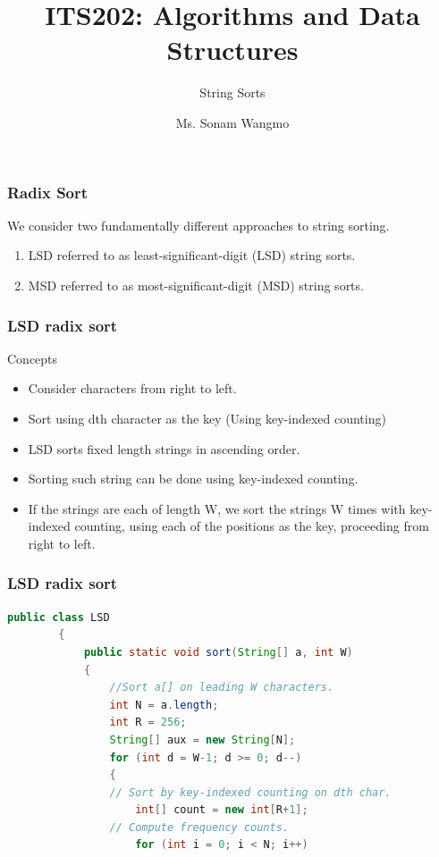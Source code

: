 \documentclass[11pt]{beamer}
\begin{document}
	\author{Ms. Sonam Wangmo}
	\title{ITS202: Algorithms and Data Structures}
	\subtitle{String Sorts}
	\institute{
		\textcolor{blue}{Gyalpozhing College of Information Technology \\ Royal University of Bhutan} \\
		\vspace{0.5cm}
	}

	\begin{frame}[plain]
		\maketitle
	\end{frame}
	
	\begin{frame}
		\frametitle{Radix Sort}
			We consider two fundamentally different approaches to string sorting.
			\begin{enumerate}
				\item LSD referred to as least-significant-digit (LSD) string sorts.
				\item MSD referred to as most-significant-digit (MSD) string sorts.
				\end{enumerate}		 
	\end{frame}

\begin{frame}
	\frametitle{LSD radix sort}
	 \begin{block}{Concepts}
	 \begin{itemize}
	 	\item Consider characters from right to left.
	 	\item Sort using dth character as the key (Using key-indexed counting)
	 	\item LSD sorts fixed length strings in ascending order.
	 	\item Sorting such string can be done using key-indexed counting. 
	 	\item If the strings are each of length W,
	 	we sort the strings W times with key-indexed counting, using
	 	each of the positions as the key, proceeding from right to left.
	 \end{itemize}
	 \end{block}
\end{frame}

\begin{frame}[fragile]
    \frametitle{LSD radix sort}
  
	\begin{lstlisting}[language=Java]		
	public class LSD
		{
			public static void sort(String[] a, int W)
			{
				//Sort a[] on leading W characters.
				int N = a.length; 
				int R = 256; 
				String[] aux = new String[N];
				for (int d = W-1; d >= 0; d--)
				{ 
				// Sort by key-indexed counting on dth char.
					int[] count = new int[R+1];   
			    // Compute frequency counts.
					for (int i = 0; i < N; i++)
					
				
	\end{lstlisting}
\end{frame}
\end{document}
